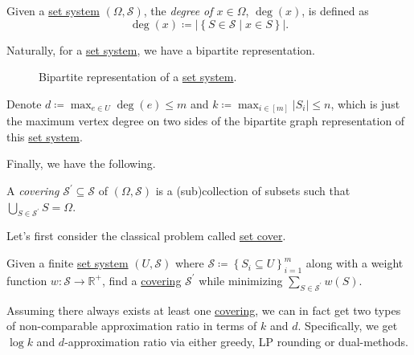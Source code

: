 \begin{definition}[Degree]\label{def:degree}
	Given a \hyperref[def:set-system]{set system} \((\Omega , \mathcal{S} )\), the \emph{degree of \(x\in \Omega\)}, \(\deg(x)\), is defined as
	\[
		\deg(x) \coloneqq \left\vert \left\{ S\in \mathcal{S} \mid x\in S \right\}  \right\vert.
	\]
\end{definition}

\begin{remark}
	Naturally, for a \hyperref[def:set-system]{set system}, we have a bipartite representation.
	\begin{figure}[H]
		\centering
		\caption{Bipartite representation of a \hyperref[def:set-system]{set system}.}
		\label{fig:set-system-bip}
	\end{figure}

	Denote \(d \coloneqq \max _{e\in U}\deg(e)\leq m\) and \(k \coloneqq \max _{i\in [m]}\left\vert S_i \right\vert \leq n\), which is just the maximum vertex degree on two sides of the bipartite graph representation of this \hyperref[def:set-system]{set system}.
\end{remark}

Finally, we have the following.

\begin{definition}[Covering]\label{def:covering}
	A \emph{covering} \(\mathcal{S} ^\prime \subseteq \mathcal{S} \) of \((\Omega , \mathcal{S} )\) is a (sub)collection of subsets such that \(\bigcup_{S\in \mathcal{S} ^\prime }S = \Omega\).
\end{definition}

Let's first consider the classical problem called \hyperref[prb:set-cover]{set cover}.

\begin{problem}\label{prb:set-cover}
Given a finite \hyperref[def:set-system]{set system} \((U, \mathcal{S} )\) where \(\mathcal{S} \coloneqq \left\{ S_i\subseteq U\right\}_{i=1}^m \) along with a weight function \(w\colon \mathcal{S} \to \mathbb{R} ^+\), find a \hyperref[def:covering]{covering} \(\mathcal{S} ^\prime \) while minimizing \(\sum_{S\in \mathcal{S} ^\prime }w(S)\).
\end{problem}

Assuming there always exists at least one \hyperref[def:covering]{covering}, we can in fact get two types of non-comparable approximation ratio in terms of \(k\) and \(d\). Specifically, we get \(\log k\) and \(d\)-approximation ratio via either greedy, LP rounding or dual-methods.

